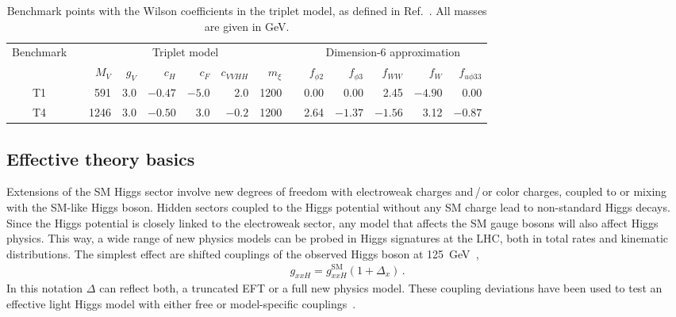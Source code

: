 \begin{table}[b!]
  \renewcommand{\arraystretch}{1.2}
  \setlength{\tabcolsep}{0.5em}
  \centering
    \begin{tabular}{c c rrrrrr  c rrrrr}
      \toprule
      \multirow{2}{*}{Benchmark} &\hspace*{1em}& \multicolumn{6}{c}{Triplet model} &\hspace*{1em}&  \multicolumn{5}{c}{Dimension-6 approximation}  \\
      \cmidrule{3-8} \cmidrule{10-14}
      && $M_V$ & $g_V$ & $c_H$ & ${c}_{F}$ & ${c}_{VVHH}$  & $m_\xi$ && $f_{\phi 2}$ & $f_{\phi 3}$ & $f_{WW}$ & $f_W$ & $f_{u \phi 33}$ \\
      \midrule
      T1 && 591 & 3.0 & $-0.47$ & $-5.0$ & 2.0 & 1200 && 0.00 & 0.00 & 2.45 & $-4.90$ & 0.00 \\
      T4 && 1246 & 3.0 & $-0.50$ & $3.0$ & $-0.2$ & 1200 && 2.64 & $-1.37$ & $-1.56$ & 3.12 & $-0.87$ \\
      \bottomrule
    \end{tabular}
  \caption{Benchmark points with the Wilson coefficients in the
    triplet model, as defined in Ref.~\cite{too_long}.  All masses are
    given in GeV.}
  \label{tab:benchmarks}
\end{table}



\subsection*{Effective theory basics}
\label{sec:validity_theory}

Extensions of the SM Higgs sector involve new degrees of freedom with
electroweak charges and\,/\,or color charges, coupled to or mixing
with the SM-like Higgs boson. Hidden sectors coupled to the Higgs
potential without any SM charge lead to non-standard Higgs
decays. Since the Higgs potential is closely linked to the electroweak
sector, any model that affects the SM gauge bosons will also affect
Higgs physics. This way, a wide range of new physics models can be
probed in Higgs signatures at the LHC, both in total rates and
kinematic distributions.  The simplest effect are shifted couplings of
the observed Higgs boson at 125~GeV~\cite{sfitter_higgs},
%
\begin{align} g_{xxH} = g_{xxH}^\text{SM} \left( 1 + \Delta_x \right)
\,.
\label{eq:shift2}
\end{align}
%
In this notation $\Delta$ can reflect both, a truncated EFT or a full
new physics model. These coupling deviations have been used to test an
effective light Higgs model with either free or model-specific
couplings~\cite{sfitter_higgs,Lopez-Val:2013yba,coupling_fits,Corbett:2015ksa}.



